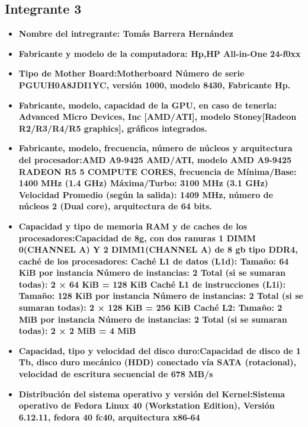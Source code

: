 \documentclass[12pt]{article}
\newcommand{\pl}[1]{\item \textbf{ #1 }}
\begin{document}
\subsection{Integrante 3}
\begin{itemize}
    \pl{Nombre del intregrante: Tomás Barrera Hernández}
    
    \pl{Fabricante y modelo de la computadora: Hp,HP All-in-One 24-f0xx }
    
    \pl{Tipo de Mother Board:Motherboard Número de serie PGUUH0A8JDI1YC, versión 1000, modelo 8430, Fabricante Hp.}
    
    \pl{Fabricante, modelo, capacidad de la GPU, en caso de tenerla: Advanced Micro Devices, Inc [AMD/ATI], modelo Stoney[Radeon R2/R3/R4/R5 graphics], gráficos integrados.}
    
    \pl{Fabricante, modelo, frecuencia, número de núcleos y arquitectura del procesador:AMD A9-9425 AMD/ATI, modelo AMD A9-9425 RADEON R5 5 COMPUTE CORES, frecuencia de Mínima/Base: 1400 MHz (1.4 GHz) Máxima/Turbo: 3100 MHz (3.1 GHz) Velocidad Promedio (según la salida): 1409 MHz, número de núcleos 2 (Dual core), arquitectura de 64 bits.}
    
    \pl{Capacidad y tipo de memoria RAM y de caches de los procesadores:Capacidad de 8g, con dos ranuras 1 DIMM 0(CHANNEL A) Y 2 DIMM1(CHANNEL A) de 8 gb tipo DDR4, caché de los procesadores:
    	Caché L1 de datos (L1d):
    	Tamaño: 64 KiB por instancia
    	Número de instancias: 2
    	Total (si se sumaran todas): 2 × 64 KiB = 128 KiB
    	Caché L1 de instrucciones (L1i):
    	Tamaño: 128 KiB por instancia
    	Número de instancias: 2
    	Total (si se sumaran todas): 2 × 128 KiB = 256 KiB
    	Caché L2:
    	Tamaño: 2 MiB por instancia
    	Número de instancias: 2
    	Total (si se sumaran todas): 2 × 2 MiB = 4 MiB
    }
    
    \pl{Capacidad, tipo y velocidad del disco duro:Capacidad de disco de 1 Tb, disco duro mecánico (HDD) conectado vía SATA (rotacional), velocidad de escritura secuencial de 678 MB/s}
    
    \pl{Distribución del sistema operativo y versión del Kernel:Sistema operativo de Fedora Linux 40 (Workstation Edition), Versión 6.12.11, fedora 40 fc40, arquitectura x86-64 }
    \end{itemize}
\end{document}
